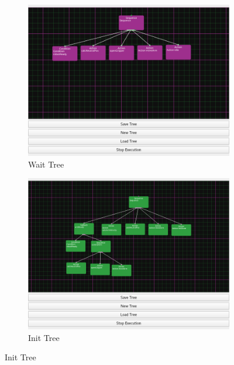 \documentclass[report]{iisthesis}
\begin{document}
\begin{figure}[h]
    \begin{subfigure}[b]{.45\linewidth}
        \includegraphics[width=\linewidth]{waitTree.png}
        \caption{Wait Tree}
    \end{subfigure}
    \begin{subfigure}[b]{.45\linewidth}
        \includegraphics[width=\linewidth]{initTree.png}
        \caption{Init Tree}
    \end{subfigure}


\end{figure}
\end{document}

